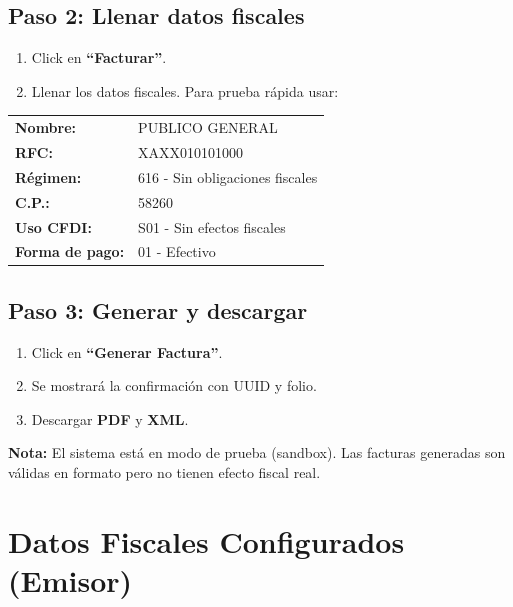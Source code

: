 \documentclass[11pt,a4paper]{article}
\begin{document}
\subsection*{Paso 2: Llenar datos fiscales}

\begin{enumerate}[leftmargin=1.5cm]
  \item Click en \textbf{``Facturar''}.
  \item Llenar los datos fiscales. Para prueba rápida usar:
\end{enumerate}

\begin{center}
\begin{tabularx}{0.7\textwidth}{lX}
  \textbf{Nombre:} & PUBLICO GENERAL \\
  \textbf{RFC:} & XAXX010101000 \\
  \textbf{Régimen:} & 616 - Sin obligaciones fiscales \\
  \textbf{C.P.:} & 58260 \\
  \textbf{Uso CFDI:} & S01 - Sin efectos fiscales \\
  \textbf{Forma de pago:} & 01 - Efectivo \\
\end{tabularx}
\end{center}

\subsection*{Paso 3: Generar y descargar}

\begin{enumerate}[leftmargin=1.5cm]
  \item Click en \textbf{``Generar Factura''}.
  \item Se mostrará la confirmación con UUID y folio.
  \item Descargar \textbf{PDF} y \textbf{XML}.
\end{enumerate}

\textbf{Nota:} El sistema está en modo de prueba (sandbox). Las facturas generadas son válidas en formato pero no tienen efecto fiscal real.

\section*{Datos Fiscales Configurados (Emisor)}
\end{document}
